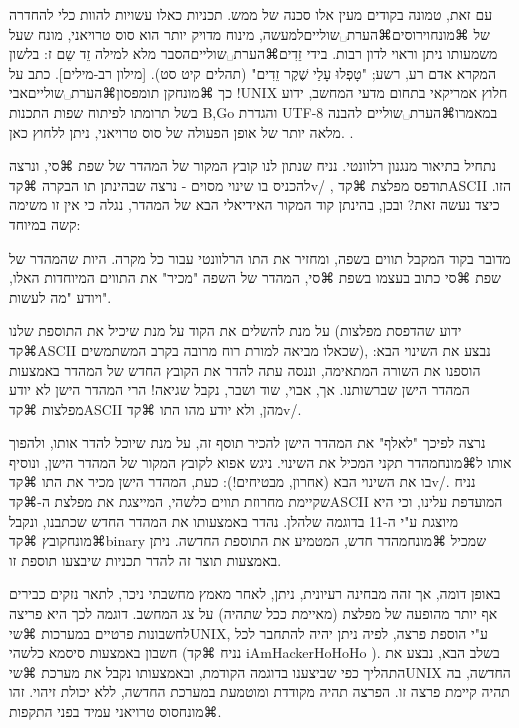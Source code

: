 עם זאת, טמונה בקודים מעין אלו סכנה של ממש. תכניות כאלו עשויות להוות כלי להחדרה של ⌘מונח{וירוסים}⌘הערת␣שוליים{למעשה, מינוח מדויק יותר הוא סוס טרויאני, מונח שעל משמעותו ניתן וראוי לדון רבות.} בידי זֵדִים⌘הערת␣שוליים{הסבר מלא למילה זֵד שֵם ז: בלשון המקרא אדם רע, רשע; "טָפְלוּ עָלַי שֶׁקֶר זֵדִים" (תהלים קיט סט). [מילון רב-מילים]}. כתב על כך ⌘מונח{קן תומפסון}⌘הערת␣שוליים{אבי !UNIX חלוץ אמריקאי בתחום מדעי המחשב, ידוע בשל תרומתו לפיתוח שפות התכנות B,Go והגדרת UTF-8} במאמרו⌘הערת␣שוליים {להבנה מלאה יותר של אופן הפעולה של סוס טרויאני, ניתן ללחוץ כאן.
 }.

נתחיל בתיאור מנגנון רלוונטי. נניח שנתון לנו קובץ המקור של המהדר של שפת ⌘סי, ונרצה להכניס בו שינוי מסוים - נרצה שבהינתן תו הבקרה ⌘קד{v/} , תודפס מפלצת ⌘קד{ASCII} הזו. כיצד נעשה זאת? ובכן, בהינתן קוד המקור האידיאלי הבא של המהדר, נגלה כי אין זו משימה קשה במיוחד:

מדובר בקוד המקבל תווים בשפה, ומחזיר את התו הרלוונטי עבור כל מקרה. היות שהמהדר של שפת ⌘סי כתוב בעצמו בשפת ⌘סי, המהדר של השפה "מכיר" את התווים המיוחדות האלו, ויודע "מה לעשות". 

על מנת להשלים את הקוד על מנת שיכיל את התוספת שלנו (ידוע שהדפסת מפלצות ⌘קד{ASCII} שכאלו מביאה למורת רוח מרובה בקרב המשתמשים), נבצע את השינוי הבא: 
הוספנו את השורה המתאימה, וננסה עתה להדר את הקובץ החדש של המהדר באמצעות המהדר הישן שברשותנו. אך, אבוי, שוד ושבר, נקבל שגיאה! הרי המהדר הישן לא יודע מפלצות ⌘קד{ASCII} מהן, ולא יודע מהו התו ⌘קד{v/}. 

נרצה לפיכך "לאלף" את המהדר הישן להכיר תוסף זה, על מנת שיוכל להדר אותו, ולהפוך אותו ל⌘מונח{מהדר} תקני המכיל את השינוי. ניגש אפוא לקובץ המקור של המהדר הישן, ונוסיף בו את השינוי הבא (אחרון, מבטיחים!):
כעת, המהדר הישן מכיר את התו ⌘קד{v/}. נניח שקיימת מחרוזת תווים כלשהי, המייצגת את מפלצת ה-⌘קד{ASCII} המועדפת עלינו, וכי היא מיוצגת ע"י ה-11 בדוגמה שלהלן. נהדר באמצעותו את המהדר החדש שכתבנו, ונקבל ⌘מונח{קובץ} ⌘קד{binary} שמכיל ⌘מונח{מהדר} חדש, המטמיע את התוספת החדשה. ניתן באמצעות תוצר זה להדר תכניות שיבצעו תוספת זו.

באופן דומה, אך זהה מבחינה רעיונית, ניתן, לאחר מאמץ מחשבתי ניכר, לתאר נזקים כבירים אף יותר מהופעה של מפלצת (מאיימת ככל שתהיה) על צג המחשב. דוגמה לכך היא פריצה לחשבונות פרטיים במערכות ⌘שי{UNIX}, ע"י הוספת פרצה, לפיה ניתן יהיה להתחבר לכל חשבון באמצעות סיסמא כלשהי (נניח ⌘קד{ iAmHackerHoHoHo }). בשלב הבא, נבצע את התהליך כפי שביצענו בדוגמה הקודמת, ובאמצעותו נקבל את מערכת ⌘שי{UNIX} החדשה, בה תהיה קיימת פרצה זו. הפרצה תהיה מקודדת ומוטמעת במערכת החדשה, ללא יכולת זיהוי. זהו ⌘מונח{סוס טרויאני} עמיד בפני התקפות.







